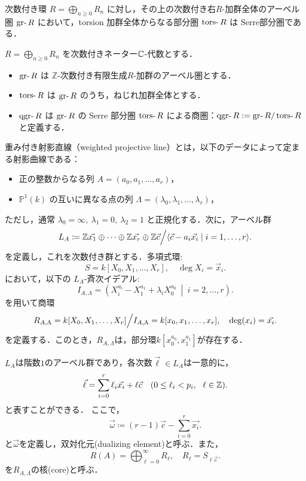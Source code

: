\begin{prop}
次数付き環 \( R = \bigoplus_{n \ge 0} R_n \) に対し，その上の次数付き右$R$-加群全体のアーベル圏 \(\gr R\) において，torsion 加群全体からなる部分圏 \(\tors R\) は Serre部分圏である．
\end{prop}

\begin{defn}\cite{AZ94}
\(
R = \bigoplus_{n \ge 0} R_n
\) を次数付きネーター${\mathbb C}$-代数とする．\vspace{-3mm}
\begin{itemize}
  \item $\gr R$ は $\mathbb{Z}$-次数付き有限生成$R$-加群のアーベル圏とする．
  \item $\tors R$ は $\gr R$ のうち，ねじれ加群全体とする．
  \item $\qgr R$ は $\gr R$ の Serre 部分圏 $\tors R$ による商圏：$\qgr R := \gr R / \tors R$ と定義する．
\end{itemize}
\end{defn}

\begin{defn}\cite{GL87}
重み付き射影直線（weighted projective line）とは，以下のデータによって定まる射影曲線である：

\begin{itemize}
  \item 正の整数からなる列 $A = (a_0, a_1, \dots, a_r)$，
  \item $\mathbb{P}^1(k)$ の互いに異なる点の列 $\Lambda = (\lambda_0, \lambda_1, \dots, \lambda_r)$，
\end{itemize}

ただし，通常 $\lambda_0 = \infty,\ \lambda_1 = 0,\ \lambda_2 = 1$ と正規化する．次に，アーベル群
\[
	L_{A} \coloneq {\mathbb Z} \vec{x_1}\oplus\cdots\oplus{\mathbb Z} \vec{x_r}\oplus {\mathbb Z}\vec{c}\Big{/}\langle\vec{c} -a_i\vec{x_i}\mid i=1,\ldots,r\rangle.
\]
を定義し，これを次数付き群とする．多項式環: 
\[
	S = k[X_0, X_1, \dots, X_r], \quad \deg X_i = \vec{x}_i. 
\]
において，以下の $L_A$-斉次イデアル:
\[
	I_{A,\Lambda} = \left( X_i^{a_i} - X_1^{a_1} + \lambda_i X_0^{a_0} \ \middle|\ i = 2, \dots, r \right).
\]
を用いて商環
\[
	R_{A,\Lambda} = k[X_0, X_1, \dots, X_r]\Big{/}I_{A,\Lambda} = k[x_0,x_1,\ldots, x_r],\quad \deg(x_i)=\vec{x_i}.
\]
を定義する．このとき，$R_{A,\Lambda}$は，部分環$k[x_0^{a_0},x_1^{a_1}]$が存在する．
\end{defn}

$L_A$は階数$1$のアーベル群であり，各次数$\vec{\ell}\in L_A$は一意的に，
\[\vec{\ell} = \sum_{i=0}^r \ell_i\vec{x_i} + \ell\vec{c}\quad (0\le \ell_i < p_i,\ \ \ell \in {\mathbb Z}).\]
と表すことができる．
ここで，
\[\vec{\omega} \coloneq (r-1)\vec{c} - \sum_{i=0}^r\vec{x_i}.\]
と$\vec{\omega}$を定義し，双対化元(dualizing element)と呼ぶ．また，
\[R(A)= \bigoplus_{\ell=0}^\infty R_{\ell},\quad R_\ell = S_{\ell\vec{c}}.\]
を$R_{A,\Lambda}$の核(core)と呼ぶ．


